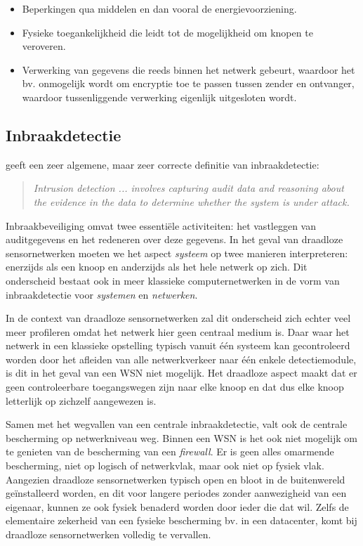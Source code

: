 \begin{itemize}[noitemsep, topsep=0pt, partopsep=0pt]

  \item{Beperkingen qua middelen en dan vooral de energievoorziening.}
  
  \item{Fysieke toegankelijkheid die leidt tot de mogelijkheid om knopen te
  veroveren.}

  \item{Verwerking van gegevens die reeds binnen het netwerk gebeurt, waardoor
  het bv. onmogelijk wordt om encryptie toe te passen tussen zender en
  ontvanger, waardoor tussenliggende verwerking eigenlijk uitgesloten wordt.}

\end{itemize}

\subsection{Inbraakdetectie}

\citep{zhang2000intrusion} geeft een zeer algemene, maar zeer correcte
definitie van inbraakdetectie:

\begin{quote}
\emph{Intrusion detection ... involves capturing audit data and reasoning about
the evidence in the data to determine whether the system is under attack.}
\end{quote}

Inbraakbeveiliging omvat twee essenti\"ele activiteiten: het vastleggen van
auditgegevens en het redeneren over deze gegevens. In het geval van draadloze
sensornetwerken moeten we het aspect \emph{systeem} op twee manieren
interpreteren: enerzijds als een knoop en anderzijds als het hele netwerk op
zich. Dit onderscheid bestaat ook in meer klassieke computernetwerken in de
vorm van inbraakdetectie voor \emph{systemen} en \emph{netwerken}.

In de context van draadloze sensornetwerken zal dit onderscheid zich echter
veel meer profileren omdat het netwerk hier geen centraal medium is. Daar waar
het netwerk in een klassieke opstelling typisch vanuit \'e\'en systeem kan
gecontroleerd worden door het afleiden van alle netwerkverkeer naar \'e\'en
enkele detectiemodule, is dit in het geval van een WSN niet mogelijk. Het
draadloze aspect maakt dat er geen controleerbare toegangswegen zijn naar elke
knoop en dat dus elke knoop letterlijk op zichzelf aangewezen is.

Samen met het wegvallen van een centrale inbraakdetectie, valt ook de centrale
bescherming op netwerkniveau weg. Binnen een WSN is het ook niet mogelijk om te
genieten van de bescherming van een \emph{firewall}. Er is geen alles omarmende
bescherming, niet op logisch of netwerkvlak, maar ook niet op fysiek vlak.
Aangezien draadloze sensornetwerken typisch open en bloot in de buitenwereld
ge\"installeerd worden, en dit voor langere periodes zonder aanwezigheid van
een eigenaar, kunnen ze ook fysiek benaderd worden door ieder die dat wil.
Zelfs de elementaire zekerheid van een fysieke bescherming bv. in een
datacenter, komt bij draadloze sensornetwerken volledig te vervallen.

